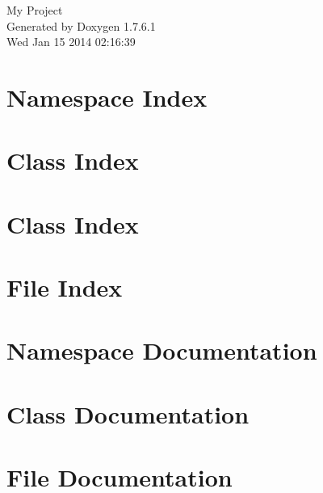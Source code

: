 \documentclass[a4paper]{book}
\begin{document}
\hypersetup{pageanchor=false,citecolor=blue}
\begin{titlepage}
\vspace*{7cm}
\begin{center}
{\Large \-My \-Project }\\
\vspace*{1cm}
{\large \-Generated by Doxygen 1.7.6.1}\\
\vspace*{0.5cm}
{\small Wed Jan 15 2014 02:16:39}\\
\end{center}
\end{titlepage}
\clearemptydoublepage
{}
\tableofcontents
\clearemptydoublepage
{}
\hypersetup{pageanchor=true,citecolor=blue}
\chapter{\-Namespace \-Index}

\chapter{\-Class \-Index}

\chapter{\-Class \-Index}

\chapter{\-File \-Index}

\chapter{\-Namespace \-Documentation}

\chapter{\-Class \-Documentation}

















\chapter{\-File \-Documentation}

\printindex
\end{document}
